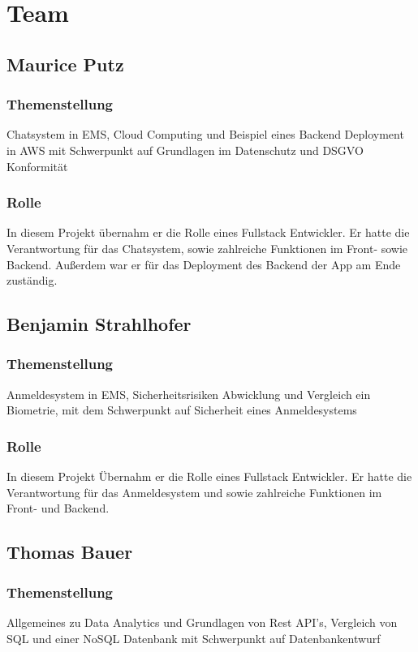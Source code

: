 \newpage
\section{Team}
\subsection{Maurice Putz}
\subsubsection{Themenstellung}
Chatsystem in EMS, Cloud Computing und Beispiel eines Backend Deployment in AWS mit Schwerpunkt auf Grundlagen im Datenschutz und DSGVO Konformität
\subsubsection{Rolle}
In diesem Projekt übernahm er die Rolle eines Fullstack Entwickler. Er hatte die Verantwortung für das Chatsystem,
sowie zahlreiche Funktionen im Front- sowie Backend. Außerdem war er für das Deployment des Backend der App am Ende zuständig.

\subsection{Benjamin Strahlhofer}
\subsubsection{Themenstellung}
Anmeldesystem in EMS, Sicherheitsrisiken Abwicklung und Vergleich ein Biometrie, mit dem Schwerpunkt auf Sicherheit eines Anmeldesystems
\subsubsection{Rolle}
In diesem Projekt Übernahm er die Rolle eines Fullstack Entwickler. Er hatte die Verantwortung für das Anmeldesystem und 
sowie zahlreiche Funktionen im Front- und Backend.

\subsection{Thomas Bauer}
\subsubsection{Themenstellung}
Allgemeines zu Data Analytics und Grundlagen von Rest API's, Vergleich von SQL und einer NoSQL Datenbank mit Schwerpunkt auf Datenbankentwurf
